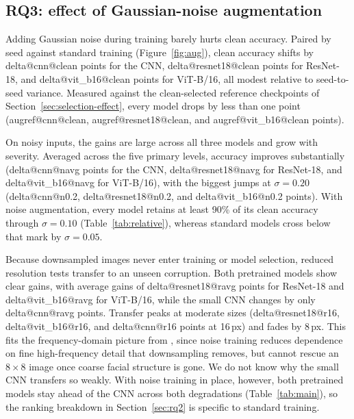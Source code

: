 \documentclass{article}
\begin{document}
\begin{table}[t]
  \caption{Relative accuracy (\%; degraded divided by clean accuracy, averaged over three seeds) and the first tested
  level where retention falls below 90\%.}
  \label{tab:relative}
  \centering
  \small
  \setlength{\tabcolsep}{3.6pt}
  \resizebox{\linewidth}{!}{}
\end{table}

\subsection{RQ3: effect of Gaussian-noise augmentation}
\label{sec:rq3}

Adding Gaussian noise during training barely hurts clean accuracy. Paired by seed against standard training
(Figure~\ref{fig:aug}), clean accuracy shifts by \num{delta@cnn@clean} points for the CNN, \num{delta@resnet18@clean}
points for ResNet-18, and \num{delta@vit_b16@clean} points for ViT-B/16, all modest relative to seed-to-seed variance.
Measured against the clean-selected reference checkpoints of Section~\ref{sec:selection-effect}, every model drops by
less than one point (\num{augref@cnn@clean}, \num{augref@resnet18@clean}, and \num{augref@vit_b16@clean} points).

On noisy inputs, the gains are large across all three models and grow with severity. Averaged across the five primary
levels, accuracy improves substantially (\num{delta@cnn@navg} points for the CNN, \num{delta@resnet18@navg} for
ResNet-18, and \num{delta@vit_b16@navg} for ViT-B/16), with the biggest jumps at $\sigma=0.20$ (\num{delta@cnn@n0.2},
\num{delta@resnet18@n0.2}, and \num{delta@vit_b16@n0.2} points). With noise augmentation, every model retains at least
90\% of its clean accuracy through $\sigma=0.10$ (Table~\ref{tab:relative}), whereas standard models cross below that
mark by $\sigma=0.05$.

Because downsampled images never enter training or model selection, reduced resolution tests transfer to an unseen
corruption. Both pretrained models show clear gains, with average gains of \num{delta@resnet18@ravg} points for ResNet-18 and
\num{delta@vit_b16@ravg} for ViT-B/16, while the small CNN changes by only \num{delta@cnn@ravg} points. Transfer peaks
at moderate sizes (\num{delta@resnet18@r16}, \num{delta@vit_b16@r16}, and \num{delta@cnn@r16} points at 16\,px) and
fades by 8\,px. This fits the frequency-domain picture from \citet{yin2019fourier}, since noise
training reduces dependence on fine high-frequency detail that downsampling removes, but cannot rescue an $8{\times}8$
image once coarse facial structure is gone. We do not know why the small CNN transfers so weakly.
With noise training in place, however, both pretrained models stay ahead of the CNN across both degradations
(Table~\ref{tab:main}), so the ranking breakdown in Section~\ref{sec:rq2} is specific to standard training.
\end{document}

